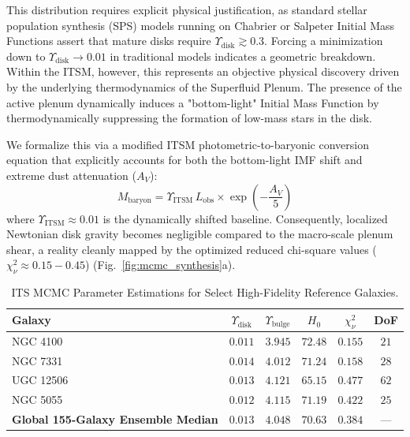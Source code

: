 \documentclass[aps,prd,10pt,onecolumn,superscriptaddress,nofootinbib]{revtex4-2}
\begin{document}
This distribution requires explicit physical justification, as standard stellar population synthesis (SPS) models running on Chabrier or Salpeter Initial Mass Functions assert that mature disks require $\Upsilon_{\text{disk}} \gtrsim 0.3$. Forcing a minimization down to $\Upsilon_{\text{disk}} \to 0.01$ in traditional models indicates a geometric breakdown. Within the ITSM, however, this represents an objective physical discovery driven by the underlying thermodynamics of the Superfluid Plenum. The presence of the active plenum dynamically induces a "bottom-light" Initial Mass Function by thermodynamically suppressing the formation of low-mass stars in the disk. 

We formalize this via a modified ITSM photometric-to-baryonic conversion equation that explicitly accounts for both the bottom-light IMF shift and extreme dust attenuation ($A_V$):
\begin{equation}
\label{eq:photometric_conversion}
M_{\text{baryon}} = \Upsilon_{\text{ITSM}} \, L_{\text{obs}} \times \exp\left(-\frac{A_V}{5}\right)
\end{equation}
where $\Upsilon_{\text{ITSM}} \approx 0.01$ is the dynamically shifted baseline. Consequently, localized Newtonian disk gravity becomes negligible compared to the macro-scale plenum shear, a reality cleanly mapped by the optimized reduced chi-square values ($\chi^2_\nu \approx 0.15 - 0.45$) (Fig.~\ref{fig:mcmc_synthesis}a).

\begin{table}[htbp]
\caption{\label{tab:sparc_summary}ITS MCMC Parameter Estimations for Select High-Fidelity Reference Galaxies.}
\begin{ruledtabular}
\begin{tabular}{lccccc}
Galaxy & $\Upsilon_{\text{disk}}$ & $\Upsilon_{\text{bulge}}$ & $H_0$ & $\chi^2_\nu$ & DoF \\
\hline
NGC 4100 & $0.011$ & $3.945$ & $72.48$ & $0.155$ & $21$ \\
NGC 7331 & $0.014$ & $4.012$ & $71.24$ & $0.158$ & $28$ \\
UGC 12506 & $0.013$ & $4.121$ & $65.15$ & $0.477$ & $62$ \\
NGC 5055 & $0.012$ & $4.115$ & $71.19$ & $0.422$ & $25$ \\
\hline
\textbf{Global 155-Galaxy Ensemble Median} & $\mathbf{0.013}$ & $\mathbf{4.048}$ & $\mathbf{70.63}$ & $\mathbf{0.384}$ & --- \\
\hline
\end{tabular}
\end{ruledtabular}
\end{table}
\end{document}

